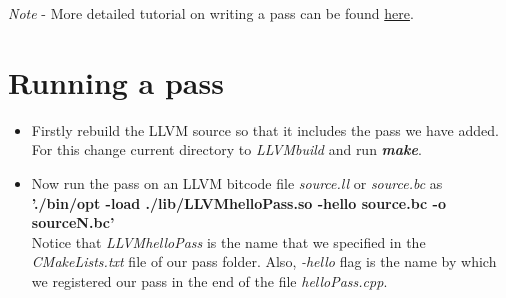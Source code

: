 \textit{Note} - More detailed tutorial on writing a pass can be found 
\href{http://llvm.org/docs/WritingAnLLVMPass.html#quick-start-writing-hello-world}{here}.

\section{Running a pass}
\label{RunningAPass}
\begin{itemize}
    \item Firstly rebuild the LLVM source so that it includes the 
    pass we have added. For this change current directory to \textit
    {LLVMbuild} and run \textbf{\textit{make}}.
    \item Now run the pass on an LLVM bitcode file 
    \textit{source.ll} or \textit{source.bc} as \\
        \textbf{'./bin/opt -load ./lib/LLVMhelloPass.so -hello source.bc -o sourceN.bc'}\\
        Notice that \textit{LLVMhelloPass} is the name that we 
        specified in the \textit{CMakeLists.txt} file of our pass 
        folder. Also, \textit{-hello} flag is the name by which we 
        registered our pass in the end of the file \textit
        {helloPass.cpp}.
\end{itemize}